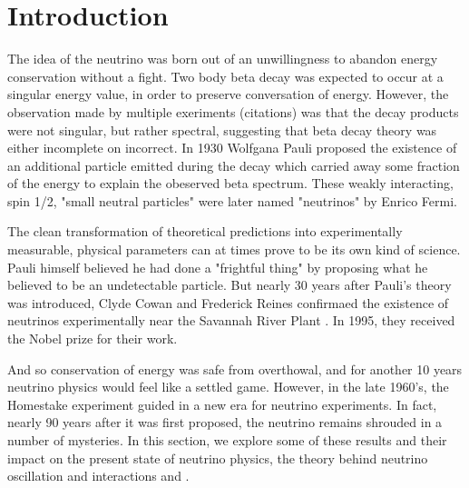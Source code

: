 \documentclass[12pt]{article}
\begin{document}
\section{Introduction}
The idea of the neutrino was born out of an unwillingness to abandon energy conservation without a fight. Two body beta decay was expected to occur at a singular energy value, in order to preserve conversation of energy. However, the observation made by multiple exeriments (citations) was that the decay products were not singular, but rather spectral, suggesting that beta decay theory was either incomplete on incorrect.  In 1930 Wolfgana Pauli proposed the existence of an additional particle emitted during the decay which carried away some fraction of the energy to explain the obeserved beta spectrum. These weakly interacting, spin 1/2, "small neutral particles" were later named "neutrinos" by Enrico Fermi. 
\par The clean transformation of theoretical predictions into experimentally measurable, physical parameters can at times prove to be its own kind of science. Pauli himself believed he had done a "frightful thing" by proposing what he believed to be an undetectable particle. But nearly 30 years after Pauli's theory was introduced, Clyde Cowan and Frederick Reines confirmaed the existence of neutrinos experimentally near the Savannah River Plant \cite{bib:cowan}. In 1995, they received the Nobel prize for their work.
\par And so conservation of energy was safe from overthowal, and for another 10 years neutrino physics would feel like a settled game. However, in the late 1960's, the Homestake experiment guided in a new era for neutrino experiments. In fact, nearly 90 years after it was first proposed, the neutrino remains shrouded in a number of mysteries. In this section, we explore some of these results and their impact on the present state of neutrino physics, the theory behind neutrino oscillation and interactions and . 
\end{document}
